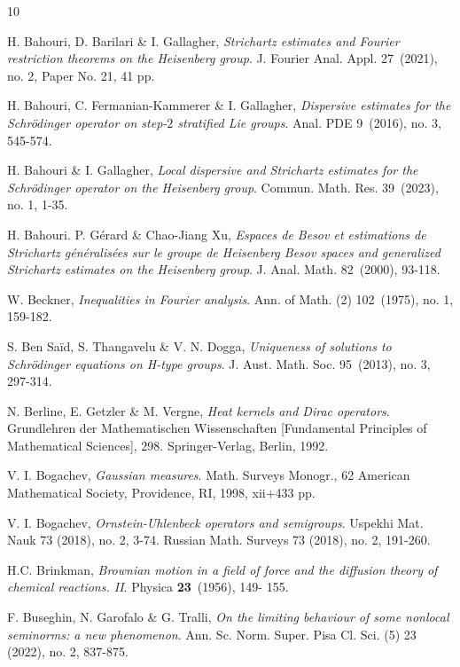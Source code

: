 \documentclass[11pt,a4paper]{amsart}
\numberwithin{equation}{section}
\numberwithin{equation}{section}
\begin{document}



\begin{thebibliography}{10}

H. Bahouri, D. Barilari \& I. Gallagher, \emph{Strichartz estimates and Fourier restriction theorems on the Heisenberg group}.
J. Fourier Anal. Appl. 27~(2021), no. 2, Paper No. 21, 41 pp.

H. Bahouri, C. Fermanian-Kammerer \& I. Gallagher, \emph{Dispersive estimates for the Schr\"odinger operator on step-$2$ stratified Lie groups}.
Anal. PDE 9~(2016), no. 3, 545-574.

H. Bahouri \& I. Gallagher, \emph{Local dispersive and Strichartz estimates for the Schr\"odinger operator on the Heisenberg group}.
Commun. Math. Res. 39~(2023), no. 1, 1-35.

H. Bahouri. P. G\'erard \& Chao-Jiang Xu, \emph{Espaces de Besov et estimations de Strichartz g\'en\'eralis\'ees sur le groupe de Heisenberg
Besov spaces and generalized Strichartz estimates on the Heisenberg group}.
J. Anal. Math. 82~(2000), 93-118.

W. Beckner, \emph{Inequalities in Fourier analysis}. Ann. of Math. (2) 102~(1975), no. 1, 159-182. 



S. Ben Sa\"id, S. Thangavelu \& V. N. Dogga, \emph{
Uniqueness of solutions to Schr\"odinger equations on H-type groups}.
J. Aust. Math. Soc. 95~(2013), no. 3, 297-314.


N. Berline, E. Getzler \& M. Vergne, \emph{Heat kernels and Dirac operators}. Grundlehren der Mathematischen Wissenschaften [Fundamental Principles of Mathematical Sciences], 298. Springer-Verlag, Berlin, 1992.

V. I. Bogachev, \emph{Gaussian measures}.
Math. Surveys Monogr., 62
American Mathematical Society, Providence, RI, 1998, xii+433 pp.

V. I. Bogachev, \emph{Ornstein-Uhlenbeck operators and semigroups}.
Uspekhi Mat. Nauk 73 (2018), no. 2, 3-74.
Russian Math. Surveys 73 (2018), no. 2, 191-260.

H.C. Brinkman, \emph{Brownian motion in a field of force and the diffusion theory of chemical reactions. II}. Physica \textbf{23}~(1956), 149- 155.


F. Buseghin, N. Garofalo \& G. Tralli, \emph{On the limiting behaviour of some nonlocal seminorms: a new phenomenon}.
Ann. Sc. Norm. Super. Pisa Cl. Sci. (5) 23 (2022), no. 2, 837-875.



\end{thebibliography}
\end{document}
